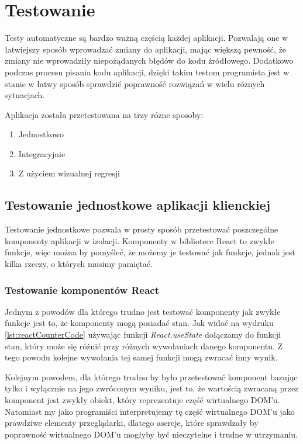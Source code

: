 \newpage
\section{Testowanie}
Testy automatyczne są bardzo ważną częścią każdej aplikacji. Pozwalają one w łatwiejszy sposób wprowadzać zmiany do aplikacji, mając większą pewność, że zmiany nie wprowadziły niepożądanych błędów do kodu źródłowego. Dodatkowo podczas procesu pisania kodu aplikacji, dzięki takim testom programista jest w stanie w łatwy sposób sprawdzić poprawność rozwiązań w wielu różnych sytuacjach.

Aplikacja została przetestowana na trzy różne sposoby:
\begin{enumerate}
  \item Jednostkowo
  \item Integracyjnie
  \item Z użyciem wizualnej regresji
\end{enumerate}

\subsection{Testowanie jednostkowe aplikacji klienckiej}
Testowanie jednostkowe pozwala w prosty sposób przetestować poszczególne komponenty aplikacji w izolacji. Komponenty w bibliotece React to zwykłe funkcje, więc można by pomyśleć, że możemy je testować jak funkcje, jednak jest kilka rzeczy, o których musimy pamiętać.

\subsubsection{Testowanie komponentów React}
Jednym z powodów dla którego trudno jest testować komponenty jak zwykłe funkcje jest to, że komponenty mogą posiadać stan. Jak widać na wydruku \ref{lst:reactCounterCode} używając funkcji \emph{React.useState} dołączamy do funkcji stan, który może się różnić przy różnych wywołaniach danego komponentu. Z tego powodu kolejne wywołania tej samej funkcji mogą zwracać inny wynik.

Kolejnym powodem, dla którego trudno by było przetestować komponent bazując tylko i wyłącznie na jego zwróconym wyniku, jest to, że wartością zwracaną przez komponent jest zwykły obiekt, który reprezentuje część wirtualnego DOM'u. Natomiast my jako programiści interpretujemy tę część wirtualnego DOM'u jako prawdziwe elementy przeglądarki, dlatego asercje, które sprawdzały by poprawność wirtualnego DOM'u mogłyby być nieczytelne i trudne w utrzymaniu.

